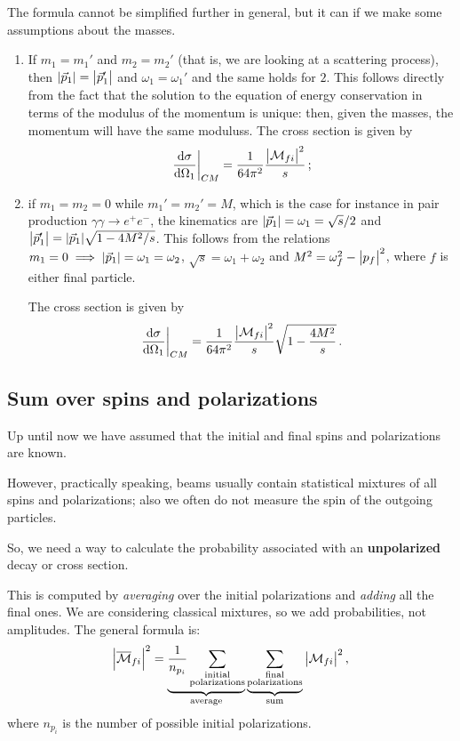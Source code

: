 \documentclass[main.tex]{subfiles}
\begin{document}
The formula cannot be simplified further in general, but it can if we make some assumptions about the masses. 
\begin{enumerate}
    \item If \(m_1 = m_1'\) and \(m_2 = m_2 '\) (that is, we are looking at a scattering process), then \(\abs{\vec{p}_1 }= \abs{\vec{p}'_1}\) and \(\omega_1 = \omega_1 '\) and the same holds for \(2\). This follows directly from the fact that the solution to the equation of energy conservation in terms of the modulus of the momentum is unique: then, given the masses, the momentum will have the same moduluss. The cross section is given by 
    \begin{align}
    \eval{\dv{\sigma }{\Omega_1 }}_{CM} = \frac{1}{64 \pi^2} \frac{\abs{\mathcal{M}_{fi}}^2}{s}
    \,;
    \end{align}
    \item  if \(m_1 = m_2 =0 \) while \(m_1 ' = m_2 ' = M\), which is the case for instance in pair production \(\gamma \gamma \to e^{+} e^{-} \), the kinematics are \(\abs{\vec{p}_1} = \omega_1 = \sqrt{s} / 2\) and \(\abs{\vec{p}_1'} = \abs{\vec{p}_1} \sqrt{1 - 4M^2/s}\).
    This follows from the relations \(m_1 =0 \implies \abs{\vec{p}_1} = \omega_{1} = \omega_2 \), \(\sqrt{s} = \omega_1 + \omega_2 \) and \(M^2 = \omega_{f}^2 - \abs{p_f}^2\), where \(f\) is either final particle.
    
    The cross section is given by 
    \begin{align}
    \eval{\dv{\sigma }{\Omega_1 }}_{CM} = \frac{1}{64 \pi^2} \frac{\abs{\mathcal{M}_{fi}}^2}{s}
    \sqrt{1 - \frac{4 M^2}{s}}
    \,.
    \end{align}
\end{enumerate}

\subsection{Sum over spins and polarizations}

Up until now we have assumed that the initial and final spins and polarizations are known. 

However, practically speaking, beams usually contain statistical mixtures of all spins and polarizations; also we often do not measure the spin of the outgoing particles. 

So, we need a way to calculate the probability associated with an \textbf{unpolarized} decay or cross section. 

This is computed by \emph{averaging} over the initial polarizations and \emph{adding} all the final ones. 
We are considering classical mixtures, so we add probabilities, not amplitudes. The general formula is:
%
\begin{align}
\abs{\overline{\mathcal{M}}_{fi}}^2
= \underbrace{\frac{1}{n_{p_i}} \sum _{\substack{\text{initial} \\ \text{polarizations}}}}_{\text{average}} \underbrace{\sum _{\substack{\text{final} \\ \text{polarizations}}}}_{\text{sum}} \abs{\mathcal{M}_{fi}}^2
\,,
\end{align}
%
where \(n_{p_i}\) is the number of possible initial polarizations.
\end{document}
